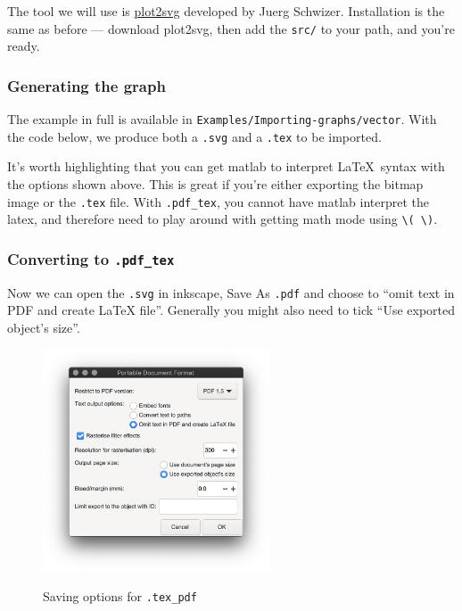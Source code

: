 The tool we will use is \href{https://uk.mathworks.com/matlabcentral/fileexchange/7401-scalable-vector-graphics-svg-export-of-figures}{plot2svg} developed by Juerg Schwizer.
Installation is the same as before --- download plot2svg, then add the \texttt{src/} to your path, and you're ready.

\subsubsection{Generating the graph}
The example in full is available in \texttt{Examples/Importing-graphs/vector}.
With the code below, we produce both a \texttt{.svg} and a \texttt{.tex} to be imported.



It's worth highlighting that you can get matlab to interpret \LaTeX\ syntax with the options shown above.
This is great if you're either exporting the bitmap image or the \texttt{.tex} file.
With \texttt{.pdf\_tex}, you cannot have matlab interpret the latex, and therefore need to play around with getting math mode using \verb|\( \)|.

\subsubsection{Converting to \texttt{.pdf\_tex}}
Now we can open the \texttt{.svg} in inkscape, Save As \texttt{.pdf} and choose to ``omit text in PDF and create LaTeX file''.
Generally you might also need to tick ``Use exported object's size''. 
\begin{figure}[h]
\centering
    \includegraphics[width=0.6\textwidth]{figures/latexpdf.png}
\label{fig:latexpdf}
\caption{Saving options for \texttt{.tex\_pdf}}
\end{figure}

